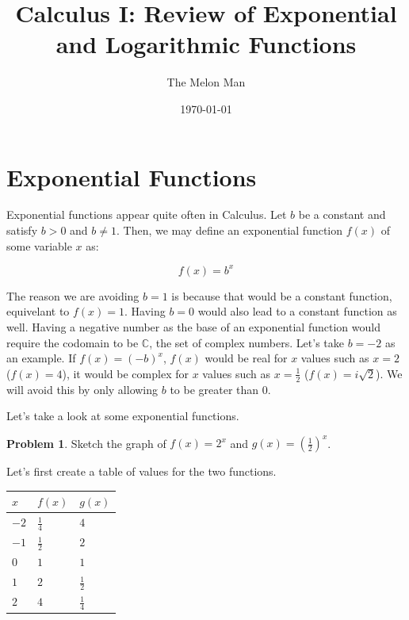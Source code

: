 \documentclass[12pt]{article}
\title{Calculus I: Review of Exponential and Logarithmic Functions}
\author{The Melon Man}
\date{\today}
\theoremstyle{definition}
\newtheorem{problem}{Problem}
\begin{document}
\maketitle

\section{Exponential Functions}
Exponential functions appear quite often in Calculus.
Let $b$ be a constant and satisfy $b>0$ and $b \neq 1$.
Then, we may define an exponential function $f(x)$ of some variable $x$ as:

\begin{equation}
    f(x) = b^x
\end{equation}

The reason we are avoiding $b=1$ is because that would be a constant function, equivelant to $f(x)=1$.
Having $b=0$ would also lead to a constant function as well.
Having a negative number as the base of an exponential function would require the codomain to be $\mathbb{C}$, the set of complex numbers.
Let's take $b=-2$ as an example.
If $f(x)=(-b)^x$, $f(x)$ would be real for $x$ values such as $x=2$ ($f(x)=4$), it would be complex for $x$ values such as $x=\frac{1}{2}$ ($f(x)=i\sqrt{2}$).
We will avoid this by only allowing $b$ to be greater than 0.

Let's take a look at some exponential functions.

\begin{problem}
Sketch the graph of $f(x)=2^x$ and $\displaystyle g(x)=\left(\frac{1}{2}\right)^x$.
\end{problem}

Let's first create a table of values for the two functions.

\begin{table}[]
    \renewcommand{\arraystretch}{1.5}
    \centering
    \begin{tabular}{>{\centering\arraybackslash}m{1cm}|>{\centering\arraybackslash}m{1cm}|>{\centering\arraybackslash}m{1cm}}
        $x$  & $f(x)$        & $g(x)$        \\ \hline
        $-2$ & $\frac{1}{4}$ & $4$           \\
        $-1$ & $\frac{1}{2}$ & $2$           \\
        $0$  & $1$           & $1$           \\
        $1$  & $2$           & $\frac{1}{2}$ \\
        $2$  & $4$           & $\frac{1}{4}$
    \end{tabular}
\end{table}
\end{document}
